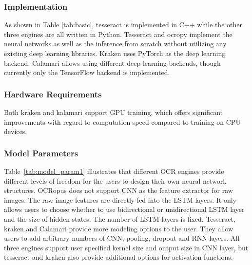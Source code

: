 \documentclass[conference]{IEEEtran}
\begin{document}
\subsubsection{Implementation}

As shown in Table \ref{tab:basic}, tesseract is implemented in C++ while the
other three engines are all written in Python. Tesseract and ocropy
implement the neural networks as well as the inference from scratch without
utilizing any existing deep learning libraries. Kraken uses PyTorch as the
deep learning backend. Calamari allows using different deep learning backends,
though currently only the TensorFlow backend is implemented.


\subsubsection{Hardware Requirements}

Both kraken and kalamari support GPU training, which offers significant
improvements with regard to computation speed compared to training on CPU devices.


\subsubsection{Model Parameters}

Table~\ref{tab:model_param1} illustrates that different OCR engines provide
different levels of freedom for the users to design their own neural network
structures. OCRopus does not support CNN as the feature extractor for raw
images. The raw image features are directly fed into the LSTM layers. It only
allows users to choose whether to use bidirectional or unidirectional LSTM
layer and the size of hidden states. The number of LSTM layers is fixed.
Tesseract, kraken and Calamari provide more modeling options to the user. They
allow users to add arbitrary numbers of CNN, pooling, dropout and RNN
layers. All three engines support user specified kernel size and output size in
CNN layer, but tesseract and kraken also provide additional options for
activation functions.

\end{document}
